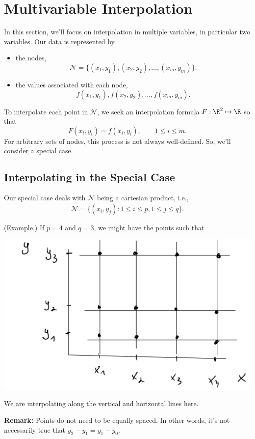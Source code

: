 \documentclass[letterpaper]{article}
\begin{document}
\section{Multivariable Interpolation}
In this section, we'll focus on interpolation in multiple variables, in particular two variables. Our data is represented by 
\begin{itemize}
    \item the nodes, 
    \[\mathcal{N} = \{(x_1, y_1), (x_2, y_2), \hdots, (x_m, y_m)\}.\]

    \item the values associated with each node, 
    \[f(x_{1}, y_{1}), f(x_{2}, y_{2}), \hdots, f(x_{m}, y_{m}).\]
\end{itemize}
To interpolate each point in $\mathcal{N}$, we seek an interpolation formula $F: \R^{2} \mapsto \R$ so that \[F(x_i, y_i) = f(x_i, y_i), \qquad 1 \leq i \leq m.\]
For arbitrary sets of nodes, this process is not always well-defined. So, we'll consider a special case. 

\subsection{Interpolating in the Special Case}
Our special case deals with $\mathcal{N}$ being a cartesian product, i.e., 
\[\mathcal{N} = \{(x_i, y_j) : 1 \leq i \leq p, 1 \leq j \leq q\}.\]
\begin{mdframed}
    (Example.) If $p = 4$ and $q = 3$, we might have the points such that 
    
    \begin{center}
        \includegraphics[scale=0.6]{../assets/multi_inter.png}
    \end{center}
    We are interpolating along the vertical and horizontal lines here.
\end{mdframed}
\textbf{Remark:} Points do not need to be equally spaced. In other words, it's not necessarily true that $y_2 - y_1 = y_1 - y_0$.
\end{document}
